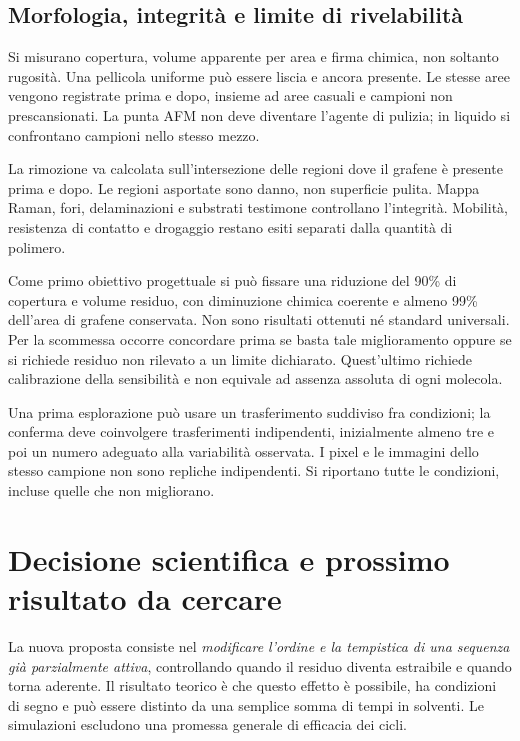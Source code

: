\documentclass[11pt,reqno]{amsart}
\numberwithin{equation}{section}
\begin{document}
\subsection{Morfologia, integrit\`a e limite di rivelabilit\`a}
Si misurano copertura, volume apparente per area e firma chimica,
non soltanto rugosit\`a. Una pellicola uniforme pu\`o essere
liscia e ancora presente. Le stesse aree vengono registrate
prima e dopo, insieme ad aree casuali e campioni non
prescansionati. La punta AFM non deve diventare l'agente di
pulizia; in liquido si confrontano campioni nello stesso mezzo.

La rimozione va calcolata sull'intersezione delle regioni dove
il grafene \`e presente prima e dopo. Le regioni asportate
sono danno, non superficie pulita. Mappa Raman, fori,
delaminazioni e substrati testimone controllano l'integrit\`a.
Mobilit\`a, resistenza di contatto e drogaggio restano esiti
separati dalla quantit\`a di polimero.

Come primo obiettivo progettuale si pu\`o fissare una riduzione
del 90\% di copertura e volume residuo, con diminuzione
chimica coerente e almeno 99\% dell'area di grafene conservata.
Non sono risultati ottenuti n\'e standard universali. Per la
scommessa occorre concordare prima se basta tale miglioramento
oppure se si richiede residuo non rilevato a un limite dichiarato.
Quest'ultimo richiede calibrazione della sensibilit\`a e non
equivale ad assenza assoluta di ogni molecola.

Una prima esplorazione pu\`o usare un trasferimento suddiviso
fra condizioni; la conferma deve coinvolgere trasferimenti
indipendenti, inizialmente almeno tre e poi un numero adeguato
alla variabilit\`a osservata. I pixel e le immagini dello
stesso campione non sono repliche indipendenti. Si riportano
tutte le condizioni, incluse quelle che non migliorano.

\section{Decisione scientifica e prossimo risultato da cercare}

La nuova proposta consiste nel \emph{modificare l'ordine e la
tempistica di una sequenza gi\`a parzialmente attiva}, controllando
quando il residuo diventa estraibile e quando torna aderente.
Il risultato teorico \`e che questo effetto \`e possibile, ha
condizioni di segno e pu\`o essere distinto da una semplice
somma di tempi in solventi. Le simulazioni escludono una
promessa generale di efficacia dei cicli.
\end{document}
